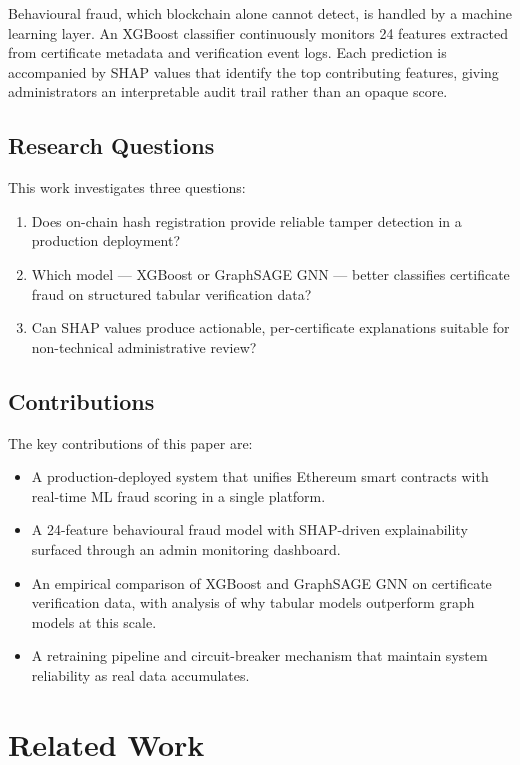 \documentclass[conference]{IEEEtran}
\begin{document}
Behavioural fraud, which blockchain alone cannot detect, is handled
by a machine learning layer. An XGBoost classifier continuously
monitors 24 features extracted from certificate metadata and
verification event logs. Each prediction is accompanied by SHAP
values that identify the top contributing features, giving
administrators an interpretable audit trail rather than an opaque
score.

\subsection{Research Questions}

This work investigates three questions:
\begin{enumerate}
    \item Does on-chain hash registration provide reliable tamper
    detection in a production deployment?
    \item Which model — XGBoost or GraphSAGE GNN — better classifies
    certificate fraud on structured tabular verification data?
    \item Can SHAP values produce actionable, per-certificate
    explanations suitable for non-technical administrative review?
\end{enumerate}

\subsection{Contributions}

The key contributions of this paper are:
\begin{itemize}
    \item A production-deployed system that unifies Ethereum smart
    contracts with real-time ML fraud scoring in a single platform.
    \item A 24-feature behavioural fraud model with SHAP-driven
    explainability surfaced through an admin monitoring dashboard.
    \item An empirical comparison of XGBoost and GraphSAGE GNN on
    certificate verification data, with analysis of why tabular
    models outperform graph models at this scale.
    \item A retraining pipeline and circuit-breaker mechanism that
    maintain system reliability as real data accumulates.
\end{itemize}

\section{Related Work}
\end{document}
